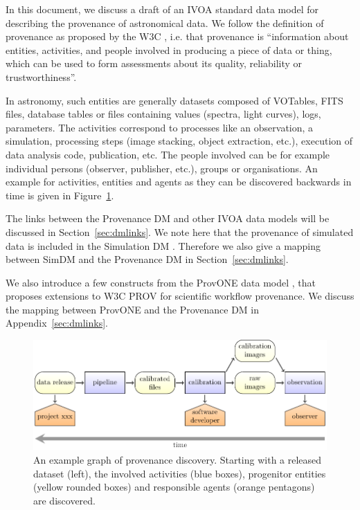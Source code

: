 
In this document, we discuss a draft of an IVOA standard data model for
describing the provenance of astronomical data. 
We follow the definition of provenance as proposed by the W3C \citep{std:W3CProvDM}, i.e. that provenance is ``information about entities, activities, and people involved in producing a piece of data or thing, which can be used to form assessments about its quality, reliability or trustworthiness''.

In astronomy, such entities are generally datasets composed of VOTables, FITS
files, database tables or files containing values (spectra, light curves), logs,
parameters.
The activities correspond to processes like an observation, a
simulation, processing steps (image stacking, object extraction, etc.), execution of data analysis code, publication, etc.
The people involved can be for example individual persons (observer, publisher, etc.), groups or organisations. An example for activities, entities and agents as they can be discovered backwards in time is given in Figure~\ref{fig:example-workflow}.

The links between the Provenance DM and other IVOA data models will be discussed in Section~\ref{sec:dmlinks}. We note here that the provenance of simulated data is included in the Simulation DM \citep[SimDM,][]{std:SimDM}. Therefore we also give a mapping between SimDM and the Provenance DM in Section~\ref{sec:dmlinks}.

We also introduce a few constructs from the ProvONE data model \citep{ProvONE}, that proposes extensions to W3C PROV for scientific workflow provenance. We discuss the mapping between ProvONE and the Provenance DM in Appendix~\ref{sec:dmlinks}.

\begin{figure}[ht]
\centering
\includegraphics[width=1\textwidth]{workflow-backwards.pdf}
\caption[Example graph of provenance discovery]{An example graph of provenance discovery. Starting with a released dataset (left), the involved activities (blue boxes), 
progenitor entities (yellow rounded boxes) and responsible agents (orange pentagons) are 
discovered.}
\label{fig:example-workflow}
\end{figure}


